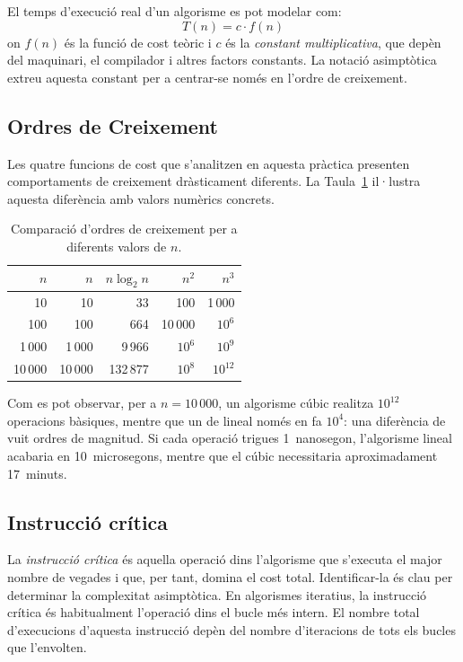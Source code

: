 \documentclass[conference,compsoc]{IEEEtran}
\begin{document}
El temps d'execució real d'un algorisme es pot modelar com:
\begin{equation}
\label{eq:temps}
T(n) = c \cdot f(n)
\end{equation}
on $f(n)$ és la funció de cost teòric i $c$ és la \textit{constant
multiplicativa}, que depèn del maquinari, el compilador i altres factors
constants. La notació asimptòtica extreu aquesta constant per a centrar-se només
en l'ordre de creixement.

\subsection{Ordres de Creixement}

Les quatre funcions de cost que s'analitzen en aquesta pràctica presenten
comportaments de creixement dràsticament diferents. La Taula~\ref{tab:growth}
il·lustra aquesta diferència amb valors numèrics concrets.

\begin{table}[!h]
      \caption{Comparació d'ordres de creixement per a diferents valors de $n$.\label{tab:growth}}
      \centering
      \begin{tabular}{r|rrrr}
            \toprule
            $n$ & $n$ & $n \log_2 n$ & $n^2$ & $n^3$ \\
            \midrule
            10     & 10       & 33         & 100         & 1\,000 \\
            100    & 100      & 664        & 10\,000     & $10^6$ \\
            1\,000  & 1\,000  & 9\,966     & $10^6$      & $10^9$ \\
            10\,000 & 10\,000 & 132\,877   & $10^8$      & $10^{12}$ \\
            \bottomrule
      \end{tabular}
\end{table}

Com es pot observar, per a $n = 10\,000$, un algorisme cúbic realitza
$10^{12}$ operacions bàsiques, mentre que un de lineal només en fa
$10^4$: una diferència de vuit ordres de magnitud. Si cada operació
trigues 1~nanosegon, l'algorisme lineal acabaria en 10~microsegons,
mentre que el cúbic necessitaria aproximadament 17~minuts.

\subsection{Instrucció crítica}

La \textit{instrucció crítica} és aquella operació dins l'algorisme que
s'executa el major nombre de vegades i que, per tant, domina el cost
total. Identificar-la és clau per determinar la
complexitat asimptòtica. En algorismes iteratius, la instrucció crítica
és habitualment l'operació dins el bucle més intern. El nombre total
d'execucions d'aquesta instrucció depèn del nombre d'iteracions de tots
els bucles que l'envolten.
\end{document}
